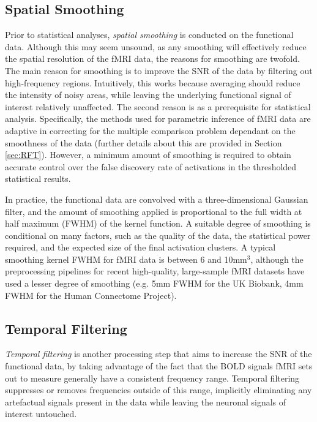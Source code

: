 \subsection{Spatial Smoothing}

Prior to statistical analyses, \textit{spatial smoothing} is conducted on the functional data. Although this may seem unsound, as any smoothing will effectively reduce the spatial resolution of the fMRI data, the reasons for smoothing are twofold. The  main reason for smoothing is to improve the SNR of the data by filtering out high-frequency regions. Intuitively, this works because averaging should reduce the intensity of noisy areas, while leaving the underlying functional signal of interest relatively unaffected. The second reason is as a prerequisite for statistical analysis. Specifically, the methods used for parametric inference of fMRI data are adaptive in correcting for the multiple comparison problem dependant on the smoothness of the data (further details about this are provided in Section \ref{sec:RFT}). However, a minimum amount of smoothing is required to obtain accurate control over the false discovery rate of activations in the thresholded statistical results.

In practice, the functional data are convolved with a three-dimensional Gaussian filter, and the amount of smoothing applied is proportional to the full width at half maximum (FWHM) of the kernel function. A suitable degree of smoothing is conditional on many factors, such as the quality of the data, the statistical power required, and the expected size of the final activation clusters. A typical smoothing kernel FWHM for fMRI data is between 6 and 10mm$^{3}$, although the preprocessing pipelines for recent high-quality, large-sample fMRI datasets have used a lesser degree of smoothing (e.g. 5mm FWHM for the UK Biobank, 4mm FWHM for the Human Connectome Project). 
 

\subsection{Temporal Filtering}
\label{sec:temporal_filtering}

\textit{Temporal filtering} is another processing step that aims to increase the SNR of the functional data, by taking advantage of the fact that the BOLD signals fMRI sets out to measure generally have a consistent frequency range. Temporal filtering suppresses or removes frequencies outside of this range, implicitly eliminating any artefactual signals present in the data while leaving the neuronal signals of interest untouched.

